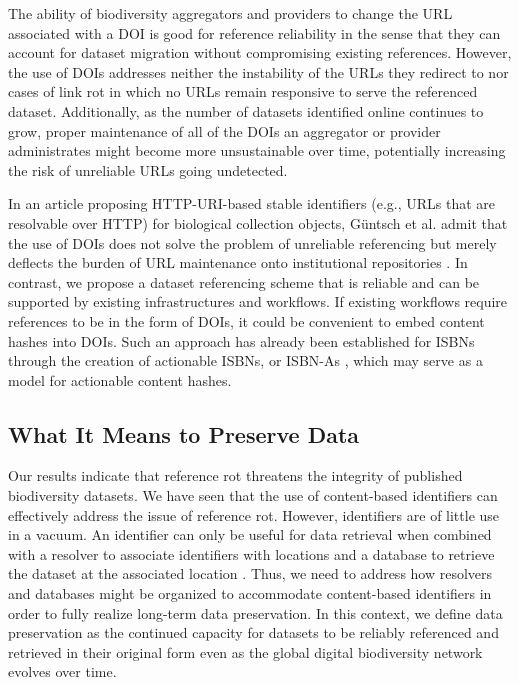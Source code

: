 The ability of biodiversity aggregators and providers to change the URL associated with a DOI is good for reference reliability in the sense that they can account for dataset migration without compromising existing references. However, the use of DOIs addresses neither the instability of the URLs they redirect to nor cases of link rot in which no URLs remain responsive to serve the referenced dataset. Additionally, as the number of datasets identified online continues to grow, proper maintenance of all of the DOIs an aggregator or provider administrates might become more unsustainable over time, potentially increasing the risk of unreliable URLs going undetected.

In an article proposing HTTP-URI-based stable identifiers (e.g., URLs that are resolvable over HTTP) for biological collection objects, Güntsch et al. admit that the use of DOIs does not solve the problem of unreliable referencing but merely deflects the burden of URL maintenance onto institutional repositories \citep{G_ntsch_2017}. In contrast, we propose a dataset referencing scheme that is reliable and can be supported by existing infrastructures and workflows. If existing workflows require references to be in the form of DOIs, it could be convenient to embed content hashes into DOIs. Such an approach has already been established for ISBNs through the creation of actionable ISBNs, or ISBN-As \citep{Weissberg_2008}, which may serve as a model for actionable content hashes.

\subsection*{What It Means to Preserve Data}
Our results indicate that reference rot threatens the integrity of published biodiversity datasets. We have seen that the use of content-based identifiers can effectively address the issue of reference rot. However, identifiers are of little use in a vacuum. An identifier can only be useful for data retrieval when combined with a resolver to associate identifiers with locations and a database to retrieve the dataset at the associated location \citep{Paskin_1999}. Thus, we need to address how resolvers and databases might be organized to accommodate content-based identifiers in order to fully realize long-term data preservation. In this context, we define data preservation as the continued capacity for datasets to be reliably referenced and retrieved in their original form even as the global digital biodiversity network evolves over time.

